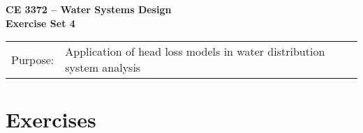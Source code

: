\documentclass[12pt]{article}
\begin{document}
\begin{center}
{\textbf{{ CE 3372 -- Water Systems Design} \\ {Exercise Set 4}}}
\end{center}
\begingroup
\begin{tabular}{p{1in} p{5in}}
Purpose: & Application of head loss models in water distribution system analysis\\


\end{tabular}
\endgroup
\section*{\small{Exercises}}
\begin{enumerate}


\end{enumerate}
\end{document}
